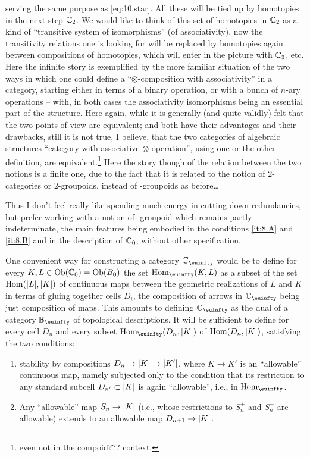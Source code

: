 serving the same purpose as \eqref{eq:10.star}. All these will be tied
up by homotopies in the next step ${\mathbb{C}}_2$. We would like to think
of this set of homotopies in ${\mathbb{C}}_2$ as a kind of ``transitive
system of isomorphisms'' (of associativity), now the transitivity
relations one is looking for will be replaced by homotopies again
between compositions of homotopies, which will enter in the picture
with ${\mathbb{C}}_3$, etc. Here the infinite story is exemplified by the
more familiar situation of the two ways in which one could define a
``$\otimes$-composition with associativity'' in a category, starting
either in terms of a binary operation, or with a bunch of $n$-ary
operations -- with, in both cases the associativity isomorphisms being
an essential part of the structure. Here again, while it is generally
(and quite validly) felt that the two points of view are equivalent;
and both have their advantages and their drawbacks, still it is not
true, I believe, that the two categories of algebraic structures
``category with associative $\otimes$-operation'', using one or the
other definition, are equivalent.\footnote{even not in the compoid???
  context.} Here the story though of the relation between the two
notions is a finite one, due to the fact that it is related to the
notion of $2$-categories or $2$-groupoids, instead of \oo-groupoids as
before\ldots

Thus I don't feel really like spending much energy in cutting down
redundancies, but prefer working with a notion of \oo-groupoid which
remains partly indeterminate, the main features being embodied in the
conditions \ref{it:8.A} and \ref{it:8.B} and in the description of
${\mathbb{C}}_0$, without other specification.

%
\label{sec:11}%
One convenient way for constructing a category $\bC_\oo$ would be
to define for every $K,L\in\operatorname{Ob}({\mathbb{C}}_0) = \operatorname{Ob}(B_0)$ the set
$\Hom_\oo(K,L)$ as a subset of the set $\operatorname{Hom}(\lvert L\rvert,\lvert K\rvert)$ of
continuous maps between the geometric realizations of $L$ and $K$ in
terms of gluing together cells $D_i$, the composition of arrows in
$\bC_\oo$ being just composition of maps. This amounts to defining
$\bC_\oo$ as the dual of a category $\bB_\oo$ of topological
descriptions. It will be sufficient to define for every cell $D_n$ and
every subset $\Hom_\oo(D_n,\abs K)$ of $\operatorname{Hom}(D_n,\lvert K\rvert)$, satisfying
the two conditions:
\begin{enumerate}[label=(\alph*)]
\item\label{it:11.a}
  stability by compositions $D_n \to \lvert K\rvert \to \lvert K'\rvert$, where $K\to
  K'$ is an ``allowable'' continuous map, namely subjected only to the
  condition that its restriction to any standard subcell $D_{n'}
  \subset \lvert K\rvert$ is again ``allowable'', i.e., in $\Hom_\oo$.
\item\label{it:11.b}
  Any ``allowable'' map $S_n \to \lvert K\rvert$ (i.e., whose restrictions to
  $S_n^+$ and $S_n^-$ are allowable) extends to an allowable map
  $D_{n+1}\to\lvert K\rvert$.
\end{enumerate}

